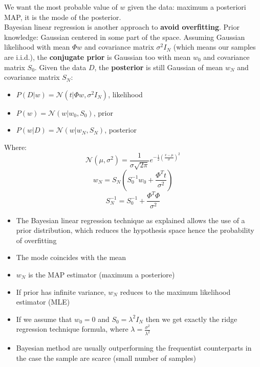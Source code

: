     We want the most probable value of $w$ given the data: maximum a posteriori MAP, it is the mode of the posterior.\\
    Bayesian linear regression is another approach to \textbf{avoid overfitting}. Prior knowledge: Gaussian centered in some part of the space. Assuming Gaussian likelihood with mean $\Phi w$ and covariance matrix $\sigma^2I_N$ (which means our samples are i.i.d.), the \textbf{conjugate prior} is Gaussian too with mean $w_0$ and covariance matrix $S_0$. Given the data $D$, the \textbf{posterior} is still Gaussian of mean $w_N$ and covariance matrix $S_N$:
    \begin{itemize}
        \item $P(D|w)=\mathcal{N}(t|\Phi w,\sigma^2I_N)$, likelihood
        \item $P(w)=\mathcal{N}(w|w_0,S_0)$, prior
        \item $P(w|D)=\mathcal{N}(w|w_N,S_N)$, posterior
    \end{itemize}
    Where:
    $$\mathcal{N}(\mu,\sigma^2)=\frac{1}{\sigma\sqrt{2\pi}}e^{-\frac{1}{2}\left(\frac{x-\mu}{\sigma}\right)^2}$$
    $$w_N = S_N(S_0^{-1} w_0 + \frac{\Phi ^T t}{\sigma ^2})$$
    $$S_N ^{-1} = S_0^{-1} + \frac{\Phi ^T \Phi}{\sigma ^2 }$$
    \begin{itemize}
        \item The Bayesian linear regression technique as explained allows the use of a prior distribution, which reduces the hypothesis space hence the probability of overfitting
        \item The mode coincides with the mean
        \item $w_N$ is the MAP estimator (maximum a posteriore)
        \item If prior has infinite variance, $w_N$ reduces to the maximum likelihood estimator (MLE)
        \item If we assume that $w_0 = 0$ and $S_0 = \lambda^2I_N$ then we get exactly the ridge regression technique formula, where $\lambda = \frac{\sigma ^2}{\lambda ^2}$
        \item Bayesian method are usually outperforming the frequentist counterparts in the case the sample are scarce (small number of samples)
    \end{itemize}